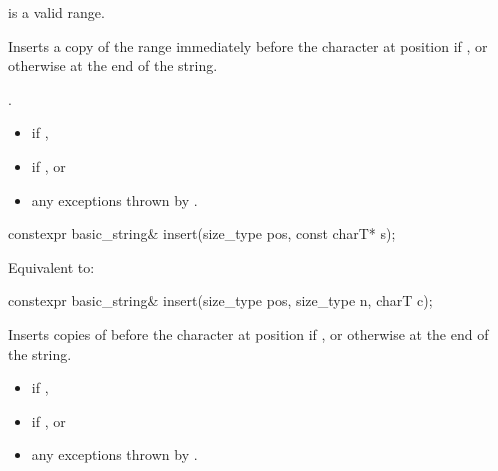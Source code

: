 \begin{itemdescr}
\pnum
\expects
{} is a valid range.

\pnum
\effects
Inserts a copy of the range 
immediately before the character at position  if ,
or otherwise at the end of the string.

\pnum
\returns
{}.

\pnum
\throws
\begin{itemize}
\item {} if ,
\item {} if , or
\item any exceptions thrown by .
\end{itemize}
\end{itemdescr}

%
\begin{itemdecl}
constexpr basic_string& insert(size_type pos, const charT* s);
\end{itemdecl}

\begin{itemdescr}
\pnum
\effects
Equivalent to: 
\end{itemdescr}

%
\begin{itemdecl}
constexpr basic_string& insert(size_type pos, size_type n, charT c);
\end{itemdecl}

\begin{itemdescr}
\pnum
\effects
Inserts  copies of  before the character at position 
if ,
or otherwise at the end of the string.

\pnum
\returns
{}

\pnum
\throws
\begin{itemize}
\item {} if ,
\item {} if , or
\item any exceptions thrown by .
\end{itemize}
\end{itemdescr}

